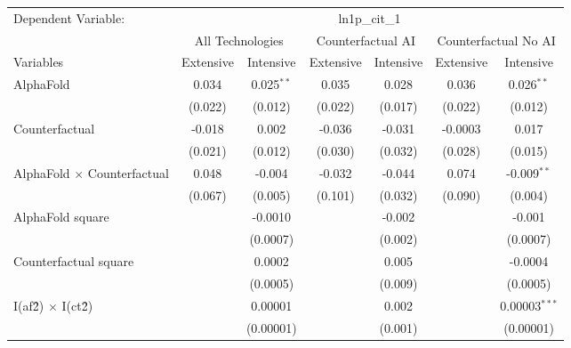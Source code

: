\begingroup
\centering
\begin{tabular}{lcccccc}
   \tabularnewline \midrule \midrule
   Dependent Variable: & \multicolumn{6}{c}{ln1p\_cit\_1}\\
 & \multicolumn{2}{c}{All Technologies} & \multicolumn{2}{c}{Counterfactual AI} & \multicolumn{2}{c}{Counterfactual No AI} \\
\cmidrule(lr){1-1}\cmidrule(lr){2-3} \cmidrule(lr){4-5} \cmidrule(lr){6-7}
Variables & \multicolumn{1}{c}{Extensive} & \multicolumn{1}{c}{Intensive} & \multicolumn{1}{c}{Extensive} & \multicolumn{1}{c}{Intensive} & \multicolumn{1}{c}{Extensive} & \multicolumn{1}{c}{Intensive} \\
\cmidrule(lr){1-1}\cmidrule(lr){2-2} \cmidrule(lr){3-3} \cmidrule(lr){4-4} \cmidrule(lr){5-5} \cmidrule(lr){6-6} \cmidrule(lr){7-7}
   AlphaFold                          & 0.034   & 0.025$^{**}$ & 0.035   & 0.028   & 0.036   & 0.026$^{**}$\\   
                                      & (0.022) & (0.012)      & (0.022) & (0.017) & (0.022) & (0.012)\\   
   Counterfactual                     & -0.018  & 0.002        & -0.036  & -0.031  & -0.0003 & 0.017\\   
                                      & (0.021) & (0.012)      & (0.030) & (0.032) & (0.028) & (0.015)\\   
   AlphaFold $\times$ Counterfactual  & 0.048   & -0.004       & -0.032  & -0.044  & 0.074   & -0.009$^{**}$\\   
                                      & (0.067) & (0.005)      & (0.101) & (0.032) & (0.090) & (0.004)\\   
   AlphaFold square                   &         & -0.0010      &         & -0.002  &         & -0.001\\   
                                      &         & (0.0007)     &         & (0.002) &         & (0.0007)\\   
   Counterfactual square              &         & 0.0002       &         & 0.005   &         & -0.0004\\   
                                      &         & (0.0005)     &         & (0.009) &         & (0.0005)\\   
   I(af\^2) $\times$ I(ct\^2)         &         & 0.00001      &         & 0.002   &         & 0.00003$^{***}$\\   
                                      &         & (0.00001)    &         & (0.001) &         & (0.00001)\\   

\end{tabular}
